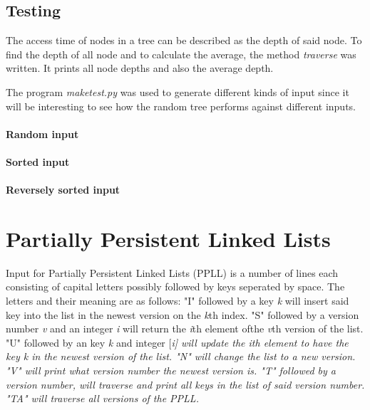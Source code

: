 \documentclass[12pt, a4paper]{article}
\begin{document}
\subsection*{Testing}
The access time of nodes in a tree can be described as the depth of said node.
To find the depth of all node and to calculate the average, the method
{\it traverse} was written. It prints all node depths and also the average depth.

The program {\it maketest.py} was used to generate different kinds of input 
since it will be interesting to see how the random tree performs against 
different inputs.
\paragraph{Random input}

\paragraph{Sorted input}

\paragraph{Reversely sorted input}




\section*{Partially Persistent Linked Lists}
Input for Partially Persistent Linked Lists (PPLL) is a number of lines each
consisting of capital letters possibly followed by keys seperated by space.
The letters and their meaning are as follows: 
"I" followed by a key {\it k} will insert said key into the list in the 
newest version on the {\it k}th index.
"S" followed by a version number {\it v} and an integer {\it i} 
will return the {\it i}th element ofthe {\it v}th version of the list.
"U" followed by an key {\it k} and integer [\it i] will update the {\it i}th
element to have the key {\it k} in the newest version of the list.
"N" will change the list to a new version.
"V" will print what version number the newest version is.
"T" followed by a version number, will traverse and print all keys in the 
list of said version number.
"TA" will traverse all versions of the PPLL.

\medskip
\end{document}
